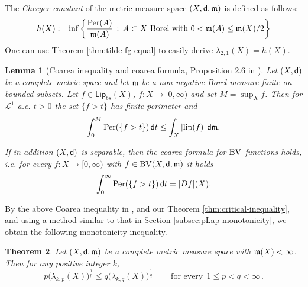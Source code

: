 \documentclass[12pt,a4paper]{article}
\newtheorem{theorem}{Theorem}[section]
\newtheorem{lemma}[theorem]{Lemma}
\begin{document}
The \textit{Cheeger constant} of the metric measure space $(X,\mathsf{d},\mathfrak m)$ is defined as follows: \begin{equation*}\label{eq:defChConst}h(X):=\inf  \left\{\frac{\mathrm{Per}(A)}{\mathfrak m(A)}\, :\, A\subset X \text{ Borel with $0<\mathfrak m(A)\leq \mathfrak m(X)/2$} \right\}
\end{equation*}
One can use Theorem \ref{thm:tilde-fg-equal} to easily derive $\lambda_{2,1}(X)=h(X) $. 
\begin{lemma}[Coarea inequality and coarea formula, Proposition 2.6 in \cite{DePonti21b}]\label{prop:lemma}
Let $(X,\mathsf{d})$ be a complete metric space and let $\mathfrak m$ be a non-negative Borel measure finite on bounded subsets. Let $f\in {\mathsf {Lip}}_{bs}(X)$, $f:X\to [0,\infty)$ and set $M=\sup_{X} f$. 
Then for $\mathcal{L}^{1}$-a.e. $t>0$ the set $\{f> t \}$ has finite perimeter and 
\begin{equation*}%
\int_{0}^{M} \Per(\{f>t\}) \, \di t \leq \int_{X} |{\rm lip}(f)| \, \di \mm.
\end{equation*}

If in addition $(X,\mathsf{d})$ is  separable, then the coarea formula for $\rm{BV}$ functions holds, i.e. for every $f:X\to [0,\infty)$ with  $f\in {\rm BV}(X, \mathsf{d},\mathfrak m)$ it holds
\begin{equation*}%
\int_{0}^{\infty} \Per(\{f>t\}) \, \di t= |Df|(X).
\end{equation*}
\end{lemma}

By the above Coarea inequality in \cite{DePonti21b}, and our Theorem \ref{thm:critical-inequality}, and using a method similar to that in Section \ref{subsec:pLap-monotonicity}, we obtain the following monotonicity inequality.
\begin{theorem}
    \label{thm:mono-mms}
Let $(X,\mathsf{d},\mathfrak m)$ be a complete metric measure space with $\mathfrak m(X)<\infty$. Then for any positive integer $k$, 
\begin{equation*}
p\big(\lambda_{k,p}(X)\big)^{\frac{1}{p}}\le q\big(\lambda_{k,q}(X)\big)^{\frac{1}{q}}\,  \qquad\textrm{for every} \ \ 1\le p<q<\infty\, .
\end{equation*}

\end{theorem}
\end{document}
